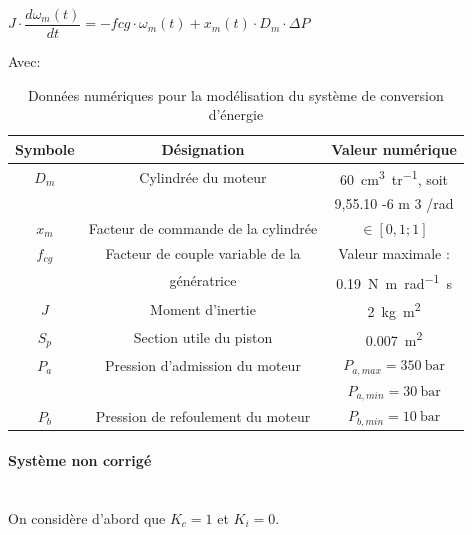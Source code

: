 \begin{center}
$J\cdot\dfrac{d\omega_m(t)}{dt}=-f{cg}\cdot\omega_m(t)+x_m(t)\cdot D_m\cdot\Delta P$
\end{center}

\newpage

Avec:
\begin{table}[ht!]
\begin{center}
\begin{tabular}{|c|c|c|}
\hline
Symbole & Désignation & Valeur numérique \\
\hline
$D_m$ & Cylindrée du moteur & \SI{60}{\cm^3 tr^{-1}}, soit \\
& & 9,55.10 -6 m 3 /rad \\
\hline
$x_m$ & Facteur de commande de la cylindrée &  $\in[0,1 ; 1]$\\
\hline
$f_{cg}$ & Facteur de couple variable de la &  Valeur maximale :\\
 & génératrice &  \SI{0,19}{\N\m rad^{-1}\s}\\
\hline
$J$ & Moment d'inertie &  \SI{2}{\kg\m^2} \\
\hline
$S_p$ & Section utile du piston &  \SI{0,007}{\m^2} \\
\hline
$P_a$ & Pression d'admission du moteur &  $P_{a,max}=\SI{350}{\bar}$\\
 & &  $P_{a,min}=\SI{30}{\bar}$\\
\hline
$P_b$ & Pression de refoulement du moteur &  $P_{b,min}=\SI{10}{\bar}$\\
\hline
\end{tabular}
\end{center}
  \caption{Données numériques pour la modélisation du système de conversion d'énergie}
\label{tab03}
\end{table}

\paragraph{Système non corrigé}~\ \\

On considère d'abord que $K_c=1$ et $K_i=0$.




